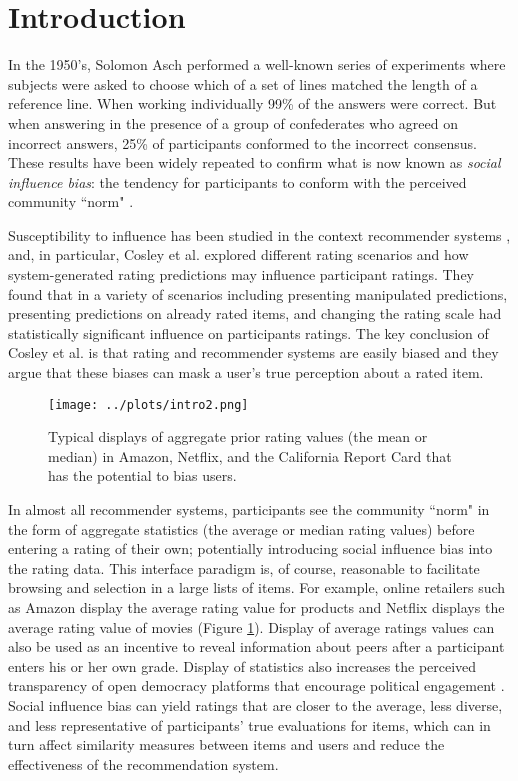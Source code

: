 \section{Introduction}
In the 1950's, Solomon Asch performed a well-known series of experiments 
\cite{asch1956studies, asch1955opinions, bond1996culture} where
subjects were asked to choose which of a set of lines matched the
length of a reference line.  
When working individually 99\% of the answers were correct.  
But when answering in the presence of a group of confederates who agreed on incorrect answers, 25\% of participants
conformed to the incorrect consensus.  
These results have been widely repeated to confirm what is now known as \emph{social influence bias}:
the tendency for participants to conform with the perceived community ``norm" \cite{demarzo2003persuasion,
moscovici1972social, wood2000attitude}.

Susceptibility to influence has been studied in the context recommender systems \cite{cosley2003seeing}, and, in particular, Cosley et al. explored
different rating scenarios and how system-generated rating predictions may influence participant ratings.
They found that in a variety of scenarios including presenting manipulated predictions, presenting predictions on already rated items, and changing the rating scale had statistically significant influence on participants ratings.
The key conclusion of Cosley et al. is that rating and recommender systems are easily biased and they argue that these biases can mask a user's true
perception about a rated item.

\begin{figure}[t]
  \centering
    \texttt{[image: ../plots/intro2.png]}
      \caption{Typical displays of aggregate prior rating values (the mean or median) in Amazon, Netflix, and the California Report Card
that has the potential to bias users.}
      \label{grading-0}
      \vspace{-1.0em}
\end{figure}

In almost all recommender systems, participants see the community ``norm" in the form of 
aggregate statistics (the average or median rating values) before entering a rating of their own;
potentially introducing social influence bias into the rating data.
This interface paradigm is, of course, reasonable to facilitate browsing and selection in a large lists of items.
For example, online retailers such as Amazon display the average rating value
for products and Netflix displays the average rating value of movies
(Figure \ref{grading-0}).  Display of average ratings values can also be
used as an incentive\cite{jian2012incentive} to reveal information about
peers after a participant enters his or her own grade.  
Display of statistics also increases the perceived transparency of open democracy platforms that encourage political engagement
\cite{albors2008new,o2012transparency,noveck2008wiki}.
Social influence bias can yield ratings that are closer to the average, less diverse, and less representative of participants' true
evaluations for items, which can in turn affect similarity measures between items and users and reduce the effectiveness of the recommendation system. 

